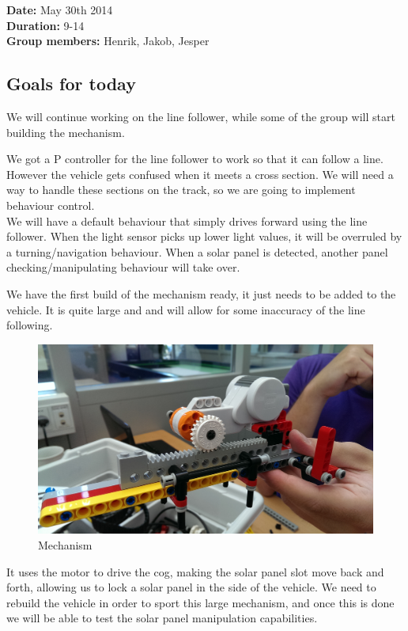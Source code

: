 \textbf{Date:} May 30th 2014\\\textbf{Duration:} 9-14\\\textbf{Group
members:} Henrik, Jakob, Jesper

\subsection{Goals for today}

We will continue working on the line follower, while some of the group
will start building the mechanism.

We got a P controller for the line follower to work so that it can
follow a line. However the vehicle gets confused when it meets a cross
section. We will need a way to handle these sections on the track, so
we are going to implement behaviour control.\\We will have a default behaviour
that simply drives forward using the line follower. When the light
sensor picks up lower light values, it will be overruled by a
turning/navigation behaviour. When a solar panel is detected, another
panel checking/manipulating behaviour will take over.

We have the first build of the mechanism ready, it just needs to be
added to the vehicle. It is quite large and and will allow for some
inaccuracy of the line following.
\begin{figure}[hbt]
  \centering
  \includegraphics[scale=0.1]{../experiments/images/mekanisme.jpg}

\caption{Mechanism}
\end{figure}

It uses the motor to drive the cog, making the solar panel slot move
back and forth, allowing us to lock a solar panel in the side of the
vehicle. We need to rebuild the vehicle in order to sport this large
mechanism, and once this is done we will be able to test the solar panel
manipulation capabilities.

